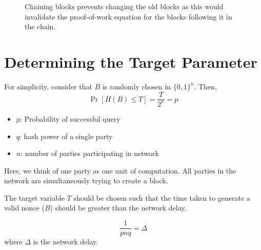 \begin{figure}[H]
	\caption{Chaining blocks prevents changing the old blocks as this would invalidate the proof-of-work equation for the blocks following it in the chain.}
	\label{fig:Blockchain}  %
\end{figure}

\section{Determining the Target Parameter}
For simplicity, consider that $B$ is randomly chosen in $\{0,1\}^\kappa$. Then,
\begin{equation}
    \Pr[H(B) \leq T] = {\frac{T}{2^\kappa}} = p
\end{equation}
\begin{itemize}
\item $p$: Probability of successful query
\item $q$: hash power of a single party
\item $n$: number of parties participating in network
\end{itemize}

Here, we think of one party as one unit of computation. All parties in the network are simultaneously trying to create a block.

The target variable $T$ should be chosen such that the time taken to generate a valid nonce ($B$) should be greater than the network delay.

\begin{equation}
    \frac{1}{pnq} = \Delta
\end{equation}
where $\Delta$ is the network delay.

